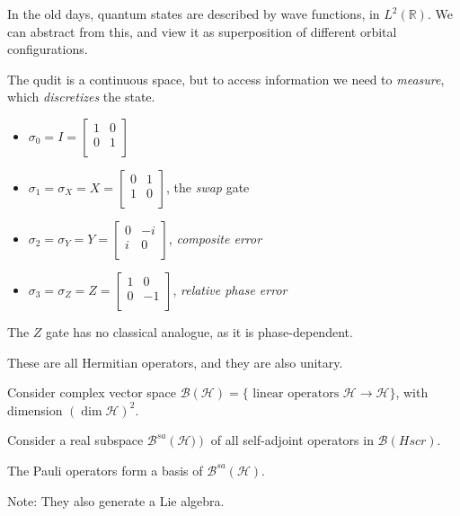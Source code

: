 \begin{remark}
	In the old days, quantum states are described by wave functions, in $L^2(\mathbb{R})$. We can abstract from this, and view it as superposition of different orbital configurations.

	The qudit is a continuous space, but to access information we need to \textit{measure}, which \textit{discretizes} the state.
\end{remark}

\begin{definition}
	\label{defn:PauliOperators}
\begin{itemize}
	\item 
		$ \sigma_0 = I = 
	\begin{bmatrix}
		1 & 0 \\
		0 & 1 \\
	\end{bmatrix}
	$
\item $\sigma_1 = \sigma_X = X =
	\begin{bmatrix}
		0 &1  \\
		1 &0  \\
	\end{bmatrix}
$, the \textit{swap} gate

\item $\sigma_2 = \sigma_Y = Y = 
 	\begin{bmatrix}
		0 & -i \\
		i & 0 \\
	\end{bmatrix}
	$, \textit{composite error}

\item $\sigma_3 = \sigma_Z = Z =
 	\begin{bmatrix}
		1 & 0 \\
		0 & -1 \\
	\end{bmatrix}
	$, \textit{relative phase error}

\end{itemize}

\end{definition}
\begin{remark}
	 The $Z$ gate has no classical analogue, as it is phase-dependent.
\end{remark}

These are all Hermitian operators, and they are also unitary. 

Consider complex vector space $\mathcal{B}(\mathscr{H}) = \{\text{ linear operators } \mathscr{H} \to \mathscr{H}\} $, with dimension $(\operatorname{dim} \mathscr{H}) ^2$. 

Consider a real subspace $\mathcal{B}^{s a}\left( \mathscr{H}) \right) $ of all self-adjoint operators in $\mathcal{B}(Hscr)$. 

The Pauli operators form a basis of $\mathcal{B}^{ sa }(\mathscr{H})$.

Note: They also generate a Lie algebra.


